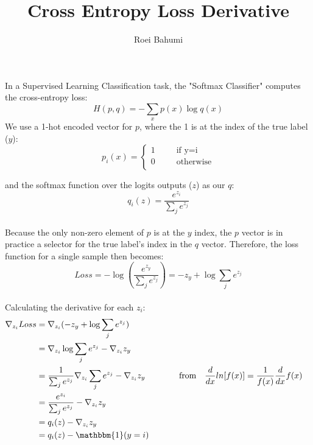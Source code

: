 \documentclass{article}
\title{Cross Entropy Loss Derivative}
\author{Roei Bahumi}
\date{}
\begin{document}
\maketitle
In a Supervised Learning Classification task, the "Softmax Classifier" computes the cross-entropy loss:
$$H(p, q) = - \sum_{x} p(x)\log q(x)$$
We use a 1-hot encoded vector for $p$, where the 1 is at the index of the true label ($y$):
$$
p_i(x)=\begin{cases}
               1 \hspace{30pt} \text{if y=i}\\
               0 \hspace{30pt} \text{otherwise}\\
            \end{cases}
$$

and the softmax function over the logits outputs ($z$) as our $q$:
\\
$$q_i(z) = \frac{e^{z_i}}{\sum_{j} e^{z_j}}$$
\\
Because the only non-zero element of $p$ is at the $y$ index, the $p$ vector is in practice a selector for the true label's index in the $q$ vector. Therefore, the loss function for a single sample then becomes:
$$Loss = -\log(\frac{e^{z_{y}}}{\sum_{j} e^{z_j}}) = -z_{y} + \log \sum_{j} e^{z_j}$$
\\

Calculating the derivative for each $z_i$:
\\
\begin{align*}
\nabla_{z_i}Loss & = \nabla_{z_i}(-z_{y} + \log \sum_{j} e^{z_j}) \\
                 & = \nabla_{z_i}\log \sum_{j} e^{z_j} -\nabla_{z_i}z_{y} \\
                 & = \frac{1}{\sum_{j} e^{z_j}}\nabla_{z_i}\sum_{j} e^{z_j} -\nabla_{z_i}z_{y} \hspace{30pt} &&\text{from} \hspace{10pt} \frac{d}{dx}ln[f(x)] = \frac{1}{f(x)}\frac{d}{dx}f(x)\\
                 & = \frac{e^{z_i}}{\sum_{j} e^{z_j}} -\nabla_{z_i}z_{y} \\
                 & = q_i(z) -\nabla_{z_i}z_{y} \\
                 & = q_i(z) - \mathbbm{1}(y=i)
\end{align*}
\\
\end{document}
